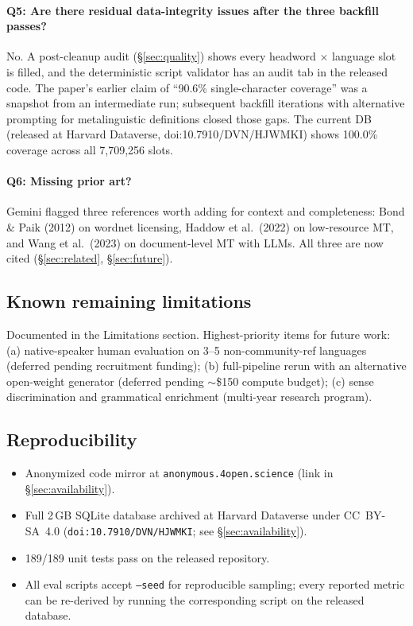 \documentclass[11pt]{article}
\begin{document}
\paragraph{Q5: Are there residual data-integrity issues after the three backfill passes?}

No. A post-cleanup audit (\S\ref{sec:quality}) shows every headword $\times$ language slot is filled, and the deterministic script validator has an audit tab in the released code. The paper's earlier claim of ``90.6\% single-character coverage'' was a snapshot from an intermediate run; subsequent backfill iterations with alternative prompting for metalinguistic definitions closed those gaps. The current DB (released at Harvard Dataverse, doi:10.7910/DVN/HJWMKI) shows 100.0\% coverage across all 7{,}709{,}256 slots.

\paragraph{Q6: Missing prior art?}

Gemini flagged three references worth adding for context and completeness: Bond \& Paik (2012) on wordnet licensing, Haddow et al.\ (2022) on low-resource MT, and Wang et al.\ (2023) on document-level MT with LLMs. All three are now cited (\S\ref{sec:related}, \S\ref{sec:future}).

\subsection{Known remaining limitations}
\label{sec:response-limitations}

Documented in the Limitations section. Highest-priority items for future work: (a) native-speaker human evaluation on 3--5 non-community-ref languages (deferred pending recruitment funding); (b) full-pipeline rerun with an alternative open-weight generator (deferred pending $\sim$\$150 compute budget); (c) sense discrimination and grammatical enrichment (multi-year research program).

\subsection{Reproducibility}
\label{sec:response-reproducibility}

\begin{itemize}
\item Anonymized code mirror at \texttt{anonymous.4open.science} (link in \S\ref{sec:availability}).
\item Full 2\,GB SQLite database archived at Harvard Dataverse under CC~BY-SA~4.0 (\texttt{doi:10.7910/DVN/HJWMKI}; see \S\ref{sec:availability}).
\item 189/189 unit tests pass on the released repository.
\item All eval scripts accept \texttt{--seed} for reproducible sampling; every reported metric can be re-derived by running the corresponding script on the released database.
\end{itemize}
\end{document}
